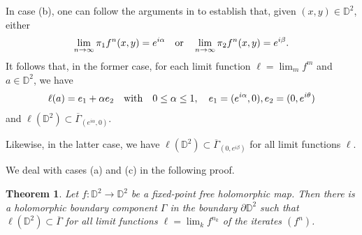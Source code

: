 \documentclass[12pt, twoside]{article}
\theoremstyle{definition}
\newtheorem*{xthm}{Theorem}
\numberwithin{equation}{section}
\begin{document}
In case (b),   one can follow the arguments in \cite[$12^0$]{h1} to establish that,
given  $(x,y) \in \mathbb{D}^2$, either
$$\lim_{n\rightarrow \infty} \pi_1 f^n(x,y) =e^{i\alpha}\quad {\rm or}
\quad  \lim_{n\rightarrow \infty} \pi_2 f^n(x,y) = e^{i\beta}.$$
 It follows that, in the former case,
for each limit function $\ell= \lim_m f^{m}$ and $a\in \mathbb{D}^2$,
we have $$\ell(a) = e_1 + \alpha e_2 \quad {\rm with} \quad 0\leq \alpha \leq 1, \quad e_1 = (e^{i\alpha},0), e_2=(0, e^{i\theta})$$
 and $\ell(\mathbb{D}^2) \subset \overline \Gamma_{(e^{i\alpha},0)}$.

 Likewise, in the latter case, we have
$\ell(\mathbb{D}^2) \subset \overline \Gamma_{(0, e^{i \beta})}$
 for all limit functions $\ell$.

We deal with cases (a) and (c) in the following proof.


\begin{xthm}\label{dw2}{\it
Let $f: \mathbb{D}^2 \longrightarrow \mathbb{D}^2$ be a fixed-point free holomorphic map.
Then there is a holomorphic boundary component $\Gamma$ in the boundary $\partial \mathbb{D}^2$ such that
$\ell(\mathbb{D}^2) \subset \overline \Gamma$ for all limit functions $\ell= \lim_k f^{n_k}$ of the iterates
$(f^n)$.}
\end{xthm}
\end{document}
